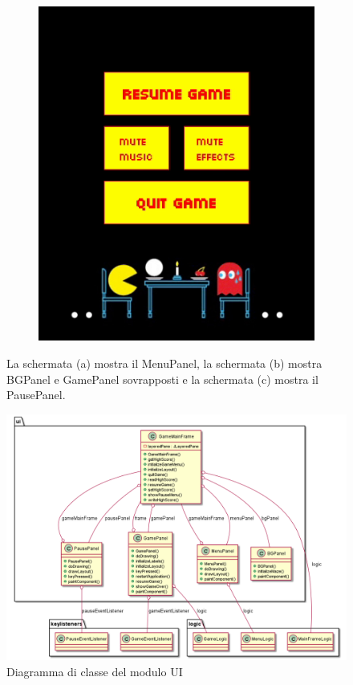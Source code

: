 \documentclass[12pt,a4paper]{report}
\begin{document}
\begin{figure}[hb!]
\begin{subfigure}{.32\textwidth}
  \caption{}
  \label{fig:snap2}
\end{subfigure}%
\begin{subfigure}{.32\textwidth}
  \centering
  \includegraphics[width=.95\linewidth]{pausepanel}
  \caption{}
  \label{fig:snap3}
\end{subfigure}
\caption{La schermata (a) mostra il MenuPanel, la schermata (b) mostra BGPanel e GamePanel sovrapposti e la schermata (c) mostra il PausePanel.}
\label{fig:fig}
\end{figure}

\newpage

\begin{figure}[tb]
  \includegraphics[width=\linewidth]{ui}
  \caption{Diagramma di classe del modulo UI}
  \label{fig:ui}
\end{figure}
\end{document}
